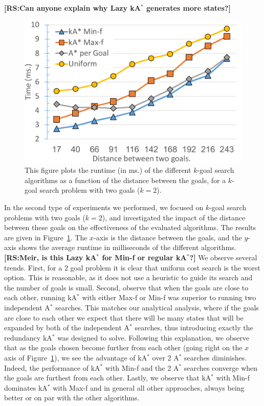 \documentclass{aicom2e}
\newcommand{\kgs}{$k$-goal search}
\newcommand{\astar}{A$^*$}
\newcommand{\kastar}{kA$^*$}
\newcommand{\minf}{Min-f}
\newcommand{\maxf}{Max-f}
\newcommand{\roni}[1]{\textbf{[RS:#1]}}
\begin{document}
\roni{Can anyone explain why Lazy \kastar{} generates more states?}




\begin{figure}
	\includegraphics[width=\columnwidth]{G0-G1_cropped.pdf}      
	\caption{This figure plots the runtime (in ms.) of the different \kgs{} algorithms as a function of the distance between the goals, for a \kgs{} problem with two goals ($k=2$).}
	\label{fig:2-goal}
\end{figure}
In the second type of experiments we performed, we focused on \kgs{} problems with two goals ($k=2$), and investigated the impact of the distance between these goals on the effectiveness of the evaluated algorithms. 
The results are given in Figure~\ref{fig:2-goal}. The $x$-axis is the distance between the goals, and the $y$-axis shows the average runtime in milliseconds of the different algorithms. \roni{Meir, is this Lazy \kastar{} for \minf{} or regular \kastar{}?} 
We observe several trends. 
First, for a 2 goal problem it is clear that uniform cost search is the worst option. 
This is reasonable, as it does not use a heuristic to guide its search and the number of goals is small. 
Second, observe that when the goals are close to each other, running \kastar{} with either \maxf{} or \minf{} was superior to running two independent \astar{} searches. This matches our analytical analysis, where if the goals are close to each other we expect that there will be many states that will be expanded by both of the independent \astar{} searches, thus introducing exactly the redundancy \kastar{} was designed to solve. 
Following this explanation, we observe that as the goals chosen become further from each other (going right on the $x$ axis of Figure~\ref{fig:2-goal}), we see the advantage of \kastar{} over 2 \astar{} searches diminishes. Indeed, the performance of \kastar{} with \minf{} and the 2 \astar{} searches converge when the goals are furthest from each other. 
Lastly, we observe that \kastar{} with \minf{} dominates \kastar{} with \maxf{} and in general all other approaches, always being better or on par with the other algorithms. 
\end{document}
